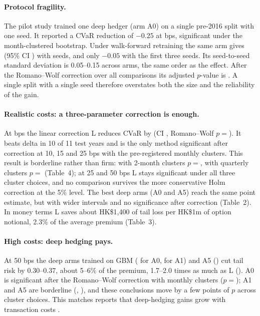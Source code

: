 \paragraph{Protocol fragility.} The pilot study trained one deep hedger (arm A0) on a single
pre-2016 split with one seed. It reported a CVaR reduction of $-0.25$ at \FocusBps{} bps, significant
under the month-clustered bootstrap. Under walk-forward retraining the same arm gives \DiffAZeroFocus{}
(95\% CI \CIAZeroFocus{}) with \NSeeds{} seeds, and only $-0.05$ with the first three seeds.
Its seed-to-seed standard deviation is 0.05--0.15 across arms, the same order as the effect.
After the Romano--Wolf correction over all \NFamily{} comparisons its adjusted $p$-value is \PRWAZeroFocus{}.
A single split with a single seed therefore overstates both the size and the reliability of the gain.

\paragraph{Realistic costs: a three-parameter correction is enough.} At \FocusBps{} bps the linear
correction L reduces CVaR by \DiffLFocus{} (CI \CILFocus{}, Romano--Wolf $p=$\PRWLFocus{}). It beats delta
in 10 of 11 test years and is the only method significant after correction at 10, 15 and 25 bps with the
pre-registered monthly clusters. This result is borderline rather than firm: with 2-month clusters
$p=$\PRWLFocusTwoM{}, with quarterly clusters $p=$\PRWLFocusQ{} (Table~4); at 25 and 50 bps L stays
significant under all three cluster choices, and no comparison survives the more conservative Holm
correction at the 5\% level.
The best deep arms (A0 and A5) reach the same point estimate, but with wider intervals and no
significance after correction (Table~2). In money terms L saves about HK\$1{,}400 of tail loss per HK\$1m of
option notional, 2.3\% of the average premium (Table~3).

\paragraph{High costs: deep hedging pays.} At 50 bps the deep arms trained on GBM
(\DiffAZeroFifty{} for A0, \DiffAOneFifty{} for A1) and A5 (\DiffAFiveFifty{}) cut tail risk by 0.30--0.37,
about 5--6\% of the premium, 1.7--2.0 times as much as L (\DiffLFifty{}). A0 is significant after the
Romano--Wolf correction with monthly clusters ($p=$\PRWAZeroFifty{}); A1 and A5 are borderline
(\PRWAOneFifty{}, \PRWAFiveFifty{}), and these conclusions move by a few points of $p$ across cluster choices.
This matches reports that deep-hedging gains grow with transaction costs \citep{francois2025ivs,bracha2025drl}.

